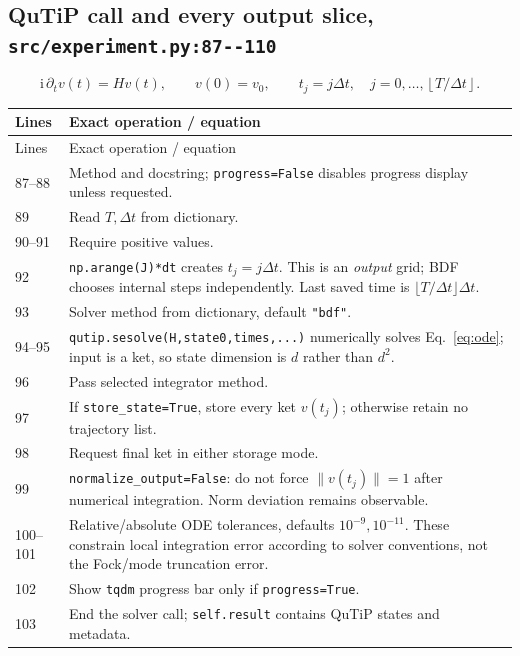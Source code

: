 \documentclass[11pt,a4paper]{article}
\newcommand{\code}[1]{\nolinkurl{#1}}
\newcommand{\ii}{\mathrm i}
\begin{document}
\subsection{QuTiP call and every output slice, \code{src/experiment.py:87--110}}

\begin{equation}
\ii\,\partial_t v(t)=H v(t),\qquad v(0)=v_0,\qquad
t_j=j\Delta t,\quad
j=0,\ldots,\left\lfloor T/\Delta t\right\rfloor.
\label{eq:ode}
\end{equation}
\begin{longtable}{p{}p{}}
\toprule Lines & Exact operation / equation\\\midrule\endfirsthead
\toprule Lines & Exact operation / equation\\\midrule\endhead
87--88 & Method and docstring; \code{progress=False} disables progress display unless requested.\\
89 & Read $T,\Delta t$ from dictionary.\\
90--91 & Require positive values.\\
92 & \code{np.arange(J)*dt} creates $t_j=j\Delta t$. This is an \emph{output} grid; BDF chooses internal steps independently. Last saved time is $\lfloor T/\Delta t\rfloor\Delta t$.\\
93 & Solver method from dictionary, default \code{"bdf"}.\\
94--95 & \code{qutip.sesolve(H,state0,times,...)} numerically solves Eq.~\eqref{eq:ode}; input is a ket, so state dimension is $d$ rather than $d^2$.\\
96 & Pass selected integrator method.\\
97 & If \code{store_state=True}, store every ket $v(t_j)$; otherwise retain no trajectory list.\\
98 & Request final ket in either storage mode.\\
99 & \code{normalize_output=False}: do not force $\|v(t_j)\|=1$ after numerical integration. Norm deviation remains observable.\\
100--101 & Relative/absolute ODE tolerances, defaults $10^{-9},10^{-11}$. These constrain local integration error according to solver conventions, not the Fock/mode truncation error.\\
102 & Show \code{tqdm} progress bar only if \code{progress=True}.\\
103 & End the solver call; \code{self.result} contains QuTiP states and metadata.\\

\end{longtable}
\end{document}
